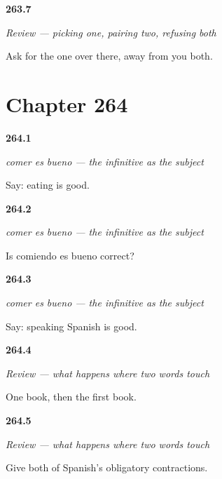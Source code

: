\noindent\begin{minipage}[t]{\linewidth}
\raggedright
\hypertarget{review-ES-C67-repaso-uno-otro-ninguno-lejos}{\textbf{263.7}} \emph{Review — picking one, pairing two, refusing both}\par
\small Ask for the one over there, away from you both.
\end{minipage}\par\medskip

\section*{Chapter 264}

\noindent\begin{minipage}[t]{\linewidth}
\raggedright
\hypertarget{review-ES-C67-comer-es-bueno-say}{\textbf{264.1}} \emph{comer es bueno — the infinitive as the subject}\par
\small Say: eating is good.
\end{minipage}\par\medskip

\noindent\begin{minipage}[t]{\linewidth}
\raggedright
\hypertarget{review-ES-C67-comer-es-bueno-trap}{\textbf{264.2}} \emph{comer es bueno — the infinitive as the subject}\par
\small Is comiendo es bueno correct?
\end{minipage}\par\medskip

\noindent\begin{minipage}[t]{\linewidth}
\raggedright
\hypertarget{review-ES-C67-comer-es-bueno-long}{\textbf{264.3}} \emph{comer es bueno — the infinitive as the subject}\par
\small Say: speaking Spanish is good.
\end{minipage}\par\medskip

\noindent\begin{minipage}[t]{\linewidth}
\raggedright
\hypertarget{review-ES-C67-repaso-cuando-dos-palabras-se-tocan-corte}{\textbf{264.4}} \emph{Review — what happens where two words touch}\par
\small One book, then the first book.
\end{minipage}\par\medskip

\noindent\begin{minipage}[t]{\linewidth}
\raggedright
\hypertarget{review-ES-C67-repaso-cuando-dos-palabras-se-tocan-fusion}{\textbf{264.5}} \emph{Review — what happens where two words touch}\par
\small Give both of Spanish's obligatory contractions.
\end{minipage}\par\medskip

